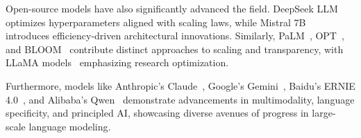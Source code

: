 Open-source models have also significantly advanced the field. DeepSeek LLM~\citep{deepseek2024llm} optimizes hyperparameters aligned with scaling laws, while Mistral 7B~\citep{jiang2023mistral} introduces efficiency-driven architectural innovations. Similarly, PaLM~\citep{chowdhery2023palm}, OPT~\citep{zhang2022opt}, and BLOOM~\citep{le2023bloom} contribute distinct approaches to scaling and transparency, with LLaMA models~\citep{touvron2023llama} emphasizing research optimization.

Furthermore, models like Anthropic's Claude~\citep{anthropic2024claude3,anthropic2024claude35,anthropic2025claude37}, Google's Gemini~\citep{deepmind2023gemini}, Baidu's ERNIE 4.0~\citep{baidu2023ernie4}, and Alibaba's Qwen~\citep{alibaba2023qwen} demonstrate advancements in multimodality, language specificity, and principled AI, showcasing diverse avenues of progress in large-scale language modeling.

